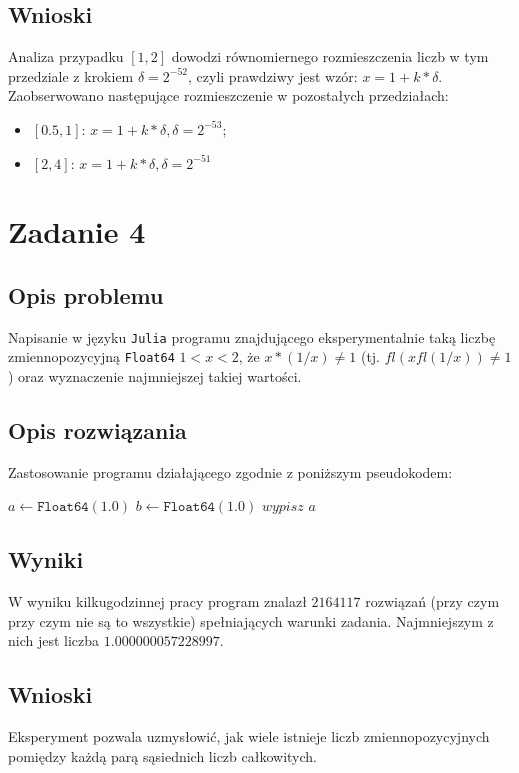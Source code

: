 \documentclass{classrep}
\begin{document}
	\subsection{Wnioski}
		Analiza przypadku $[1,2]$ dowodzi równomiernego rozmieszczenia liczb w tym przedziale z krokiem $\delta = 
		2^{-52}$, czyli prawdziwy jest wzór: $x=1+k*\delta$. Zaobserwowano następujące rozmieszczenie w pozostałych 
		przedziałach:
		\begin{itemize}
			\item $[0.5,1]$: $x=1+k*\delta, \delta = 2^{-53}$;
			\item $[2,4]$: $x=1+k*\delta, \delta = 2^{-51}$
		\end{itemize}
\section{Zadanie 4}
	\subsection{Opis problemu}
		Napisanie w języku \texttt{Julia} programu znajdującego eksperymentalnie taką liczbę zmiennopozycyjną 
		\texttt{Float64} $1<x<2$, że $x*(1/x)\neq1$ (tj. $fl(xfl(1/x))\neq1$) oraz wyznaczenie najmniejszej takiej
		wartości.
	\subsection{Opis rozwiązania}
		Zastosowanie programu działającego zgodnie z poniższym pseudokodem:
		\begin{algorithm}
		\begin{algorithmic}
			\State $a\gets \texttt{Float64}(1.0)$
			\State $b\gets \texttt{Float64}(1.0)$
					$wypisz$ $a$
				\EndIf
			\EndWhile
		\end{algorithmic}
		\caption{}
		\end{algorithm}
		
	\subsection{Wyniki}
		W wyniku kilkugodzinnej pracy program znalazł $2164117$ rozwiązań (przy czym przy czym nie są to wszystkie) spełniających warunki zadania. Najmniejszym z nich jest liczba $1.000000057228997$.
	\subsection{Wnioski}
		Eksperyment pozwala uzmysłowić, jak wiele istnieje liczb zmiennopozycyjnych pomiędzy każdą parą sąsiednich liczb 
		całkowitych.
\end{document}
